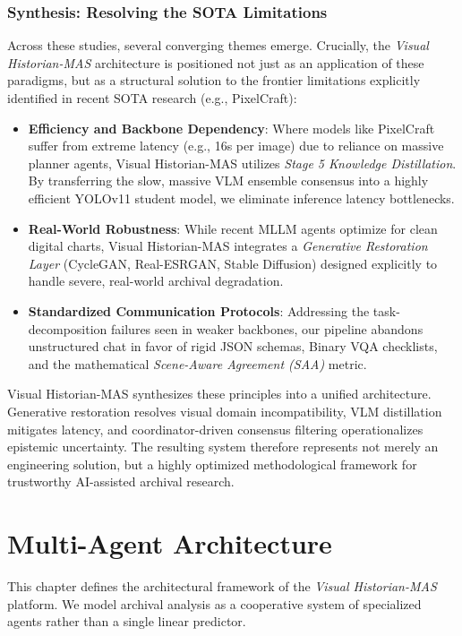 \documentclass[12pt,onecolumn,a4paper]{IEEEtran}
\begin{document}
\subsubsection{Synthesis: Resolving the SOTA Limitations}
Across these studies, several converging themes emerge. Crucially, the \textit{Visual Historian-MAS} architecture is positioned not just as an application of these paradigms, but as a structural solution to the frontier limitations explicitly identified in recent SOTA research (e.g., PixelCraft):

\begin{itemize}
    \item \textbf{Efficiency and Backbone Dependency}: Where models like PixelCraft suffer from extreme latency (e.g., 16s per image) due to reliance on massive planner agents, Visual Historian-MAS utilizes \textit{Stage 5 Knowledge Distillation}. By transferring the slow, massive VLM ensemble consensus into a highly efficient YOLOv11 student model, we eliminate inference latency bottlenecks.
    \item \textbf{Real-World Robustness}: While recent MLLM agents optimize for clean digital charts, Visual Historian-MAS integrates a \textit{Generative Restoration Layer} (CycleGAN, Real-ESRGAN, Stable Diffusion) designed explicitly to handle severe, real-world archival degradation.
    \item \textbf{Standardized Communication Protocols}: Addressing the task-decomposition failures seen in weaker backbones, our pipeline abandons unstructured chat in favor of rigid JSON schemas, Binary VQA checklists, and the mathematical \textit{Scene-Aware Agreement (SAA)} metric.
\end{itemize}

Visual Historian-MAS synthesizes these principles into a unified architecture. Generative restoration resolves visual domain incompatibility, VLM distillation mitigates latency, and coordinator-driven consensus filtering operationalizes epistemic uncertainty. The resulting system therefore represents not merely an engineering solution, but a highly optimized methodological framework for trustworthy AI-assisted archival research.
\section{Multi-Agent Architecture}
This chapter defines the architectural framework of the \textit{Visual Historian-MAS} platform. We model archival analysis as a cooperative system of specialized agents rather than a single linear predictor. 
\end{document}
